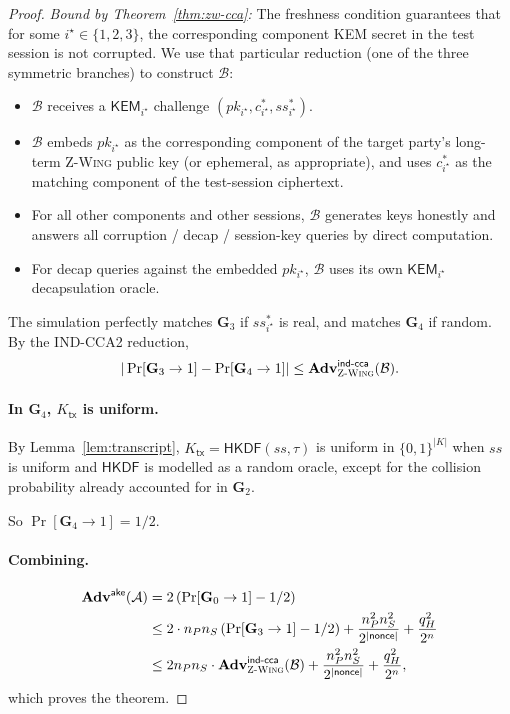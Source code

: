 \documentclass[11pt,a4paper]{article}
\theoremstyle{definition}
\theoremstyle{remark}
\newcommand{\KEM}{\ensuremath{\mathsf{KEM}}}
\newcommand{\Adv}{\ensuremath{\mathbf{Adv}}}
\providecommand{\Game}{}\renewcommand{\Game}{\ensuremath{\mathbf{G}}}
\newcommand{\zwing}{\textsc{Z-Wing}}
\newcommand{\hkdf}{\ensuremath{\mathsf{HKDF}}}
\newcommand{\BB}{\ensuremath{\{0,1\}}}
\begin{document}
\begin{proof}
\emph{Bound by Theorem~\ref{thm:zw-cca}:} The freshness condition guarantees
that for some $i^\star \in \{1, 2, 3\}$, the corresponding component KEM
secret in the test session is not corrupted. We use that
particular reduction (one of the three symmetric branches) to construct
$\mathcal{B}$:
\begin{itemize}
\item $\mathcal{B}$ receives a $\KEM_{i^\star}$ challenge $(pk_{i^\star}, c^*_{i^\star}, ss^*_{i^\star})$.
\item $\mathcal{B}$ embeds $pk_{i^\star}$ as the corresponding component of the
target party's long-term \zwing{} public key (or ephemeral, as appropriate),
and uses $c^*_{i^\star}$ as the matching component of the test-session
ciphertext.
\item For all other components and other sessions, $\mathcal{B}$ generates
keys honestly and answers all corruption / decap / session-key queries by
direct computation.
\item For decap queries against the embedded $pk_{i^\star}$, $\mathcal{B}$
uses its own $\KEM_{i^\star}$ decapsulation oracle.
\end{itemize}
The simulation perfectly matches $\Game_3$ if $ss^*_{i^\star}$ is real, and
matches $\Game_4$ if random. By the IND-CCA2 reduction,
\[
|\Pr[\Game_3 \to 1] - \Pr[\Game_4 \to 1]| \le \Adv^{\mathsf{ind\text{-}cca}}_{\zwing}(\mathcal{B}).
\]

\paragraph{In $\Game_4$, $K_{\mathsf{tx}}$ is uniform.}
By Lemma~\ref{lem:transcript}, $K_{\mathsf{tx}} = \hkdf(ss, \tau)$ is uniform
in $\BB^{|K|}$ when $ss$ is uniform and $\hkdf$ is modelled as a random
oracle, except for the collision probability already accounted for in
$\Game_2$.

So $\Pr[\Game_4 \to 1] = 1/2$.

\paragraph{Combining.}
\begin{align*}
\Adv^{\mathsf{ake}}(\mathcal{A}) & = 2 \left(\Pr[\Game_0 \to 1] - 1/2\right) \\
& \le 2 \cdot n_P n_S \left(\Pr[\Game_3 \to 1] - 1/2\right) + \frac{n_P^2 n_S^2}{2^{|\mathsf{nonce}|}} + \frac{q_H^2}{2^n} \\
& \le 2 n_P n_S \cdot \Adv^{\mathsf{ind\text{-}cca}}_{\zwing}(\mathcal{B}) + \frac{n_P^2 n_S^2}{2^{|\mathsf{nonce}|}} + \frac{q_H^2}{2^n},
\end{align*}
which proves the theorem. \qedhere
\end{proof}
\end{document}
